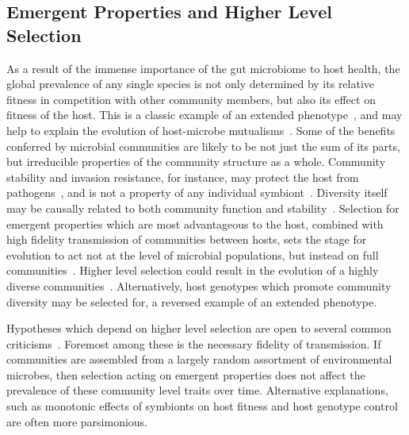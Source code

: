 \documentclass[12pt]{article}
\begin{document}
\subsection{Emergent Properties and Higher Level Selection}
As a result of the immense importance of the gut microbiome to host health,
the global prevalence of any single species is not only determined by its
relative fitness in competition with other community members,
but also its effect on fitness of the host.
This is a classic example of an extended phenotype~\citep{Dawkins1982},
and may help to explain
the evolution of host-microbe mutualisms~\citep{Dethlefsen2007a}.
Some of the benefits conferred by microbial communities
are likely to be not just the sum of its parts,
but irreducible properties of the community structure as a whole.
Community stability and invasion resistance, for instance, may protect the
host from pathogens~\citep{TODO},
and is not a property of any individual symbiont~\citep{TODO}.
Diversity itself may be causally related to both community function and
stability~\citep[reviewed in][]{McCann2000}.
Selection for emergent properties which are most advantageous to the host,
combined with high fidelity transmission of communities between hosts,
sets the stage for evolution to act not at the level of microbial populations,
but instead on full communities~\citep{TODO}.
Higher level selection could result in the evolution of a highly diverse
communities~\citep{Hutchinson1959}.
Alternatively, host genotypes which promote community diversity may be
selected for,
a reversed example of an extended phenotype.

Hypotheses which depend on higher level selection are open to several common
criticisms~\citep{TODO}.
Foremost among these is the necessary fidelity of transmission.
If communities are assembled from a largely random assortment of environmental
microbes,
then selection acting on emergent properties does not affect the prevalence
of these community level traits over time.
Alternative explanations, such as monotonic effects of symbionts on host
fitness and host genotype control are often more parsimonious.
\end{document}
